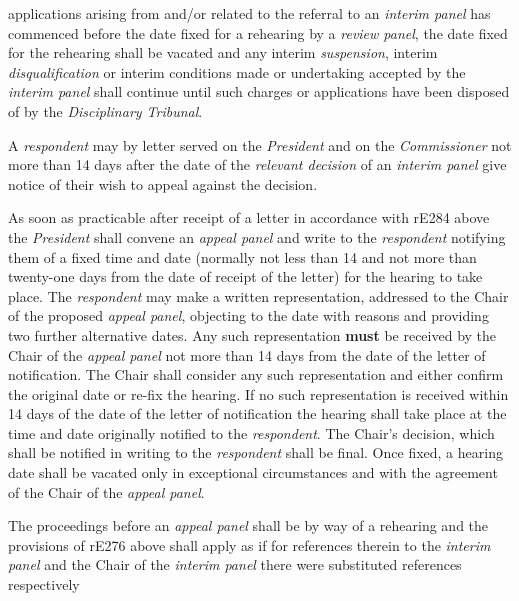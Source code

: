 applications arising from and/or related to the referral to
an \emph{interim panel} has commenced before the date fixed for a
rehearing by a \emph{review panel}, the date fixed for the rehearing
shall be vacated and any interim \emph{suspension},
interim \emph{disqualification} or interim conditions made or
undertaking accepted by the \emph{interim panel} shall continue until
such charges or applications have been disposed of by
the \emph{Disciplinary Tribunal}.\\
\par
{}
A \emph{respondent} may by letter served on the \emph{President} and on
the \emph{Commissioner }not more than 14 days after the date of
the \emph{relevant decision} of an \emph{interim panel} give notice of
their wish to appeal against the decision.\\
\par
As soon as practicable after receipt of a letter in accordance with
rE284 above the \emph{President} shall convene an \emph{appeal
panel} and write to the \emph{respondent} notifying them of a fixed time
and date (normally not less than 14 and not more than twenty-one days
from the date of receipt of the letter) for the hearing to take place.
The \emph{respondent} may make a written representation, addressed to
the Chair of the proposed \emph{appeal panel}, objecting to the date
with reasons and providing two further alternative dates. Any such
representation  \textcolor{myred}{\textbf{must}} be received by the Chair of the \emph{appeal
panel} not more than 14 days from the date of the letter of
notification. The Chair shall consider any such representation and
either confirm the original date or re-fix the hearing. If no such
representation is received within 14 days of the date of the letter of
notification the hearing shall take place at the time and date
originally notified to the \emph{respondent}. The Chair's decision,
which shall be notified in writing to the \emph{respondent} shall be
final. Once fixed, a hearing date shall be vacated only in exceptional
circumstances and with the agreement of the Chair of the \emph{appeal
panel}.\\
\par
The proceedings before an \emph{appeal panel} shall be by way of a
rehearing and the provisions of rE276 above shall apply as if for
references therein to the \emph{interim panel} and the Chair of
the \emph{interim panel} there were substituted references respectively
